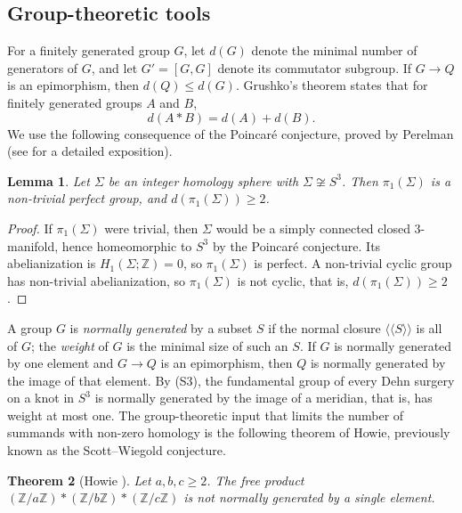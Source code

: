 \documentclass[11pt]{article}
\newcommand{\Z}{\mathbb Z}
\newcommand{\rk}{d}
\newtheorem{theorem}{Theorem}[section]
\newtheorem{lemma}[theorem]{Lemma}
\theoremstyle{definition}
\theoremstyle{remark}
\begin{document}
\subsection{Group-theoretic tools}\label{sec:groups}

For a finitely generated group \(G\), let \(\rk(G)\) denote the minimal
number of generators of \(G\), and let \(G'=[G,G]\) denote its commutator
subgroup. If \(G\to Q\) is an epimorphism, then \(\rk(Q)\leq\rk(G)\).
Grushko's theorem \cite{Grushko1940} states that for finitely generated
groups \(A\) and \(B\),
\begin{equation}\label{eq:grushko}
 \rk(A*B)=\rk(A)+\rk(B).
\end{equation}
We use the following consequence of the Poincar\'e conjecture, proved
by Perelman (see \cite{MorganTian2007} for a detailed exposition).

\begin{lemma}\label{lem:perfect}
Let \(\Sigma\) be an integer homology sphere with \(\Sigma\not\cong S^3\).
Then \(\pi_1(\Sigma)\) is a non-trivial perfect group, and
\(\rk(\pi_1(\Sigma))\geq2\).
\end{lemma}

\begin{proof}
If \(\pi_1(\Sigma)\) were trivial, then \(\Sigma\) would be a simply
connected closed \(3\)-manifold, hence homeomorphic to \(S^3\) by the
Poincar\'e conjecture. Its abelianization is
\(H_1(\Sigma;\Z)=0\), so \(\pi_1(\Sigma)\) is perfect. A non-trivial
cyclic group has non-trivial abelianization, so \(\pi_1(\Sigma)\) is not
cyclic, that is, \(\rk(\pi_1(\Sigma))\geq2\).
\end{proof}

A group \(G\) is \emph{normally generated} by a subset \(S\) if the
normal closure \(\langle\!\langle S\rangle\!\rangle\) is all of \(G\); the
\emph{weight} of \(G\) is the minimal size of such an \(S\). If \(G\) is
normally generated by one element and \(G\to Q\) is an epimorphism, then
\(Q\) is normally generated by the image of that element. By (S3), the
fundamental group of every Dehn surgery on a knot in \(S^3\) is normally
generated by the image of a meridian, that is, has weight at most one.
The group-theoretic input that limits the number of summands with
non-zero homology is the following theorem of Howie, previously known as
the Scott--Wiegold conjecture.

\begin{theorem}[Howie {\cite{Howie2002}}]\label{thm:howie}
Let \(a,b,c\geq2\). The free product
\((\Z/a\Z)*(\Z/b\Z)*(\Z/c\Z)\) is not normally generated by a single
element.
\end{theorem}
\end{document}
